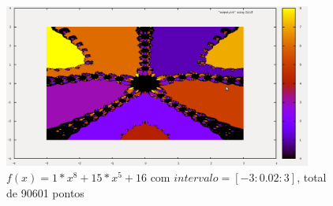   \begin{figure}[htp]
    \centering
    \includegraphics[width=0.9\textwidth]{imgs/img6.png}
    \caption{$f(x) = 1*x^8 + 15*x^5 + 16$ com $intervalo = [-3: 0.02: 3]$, total de 90601  pontos}
  \end{figure}